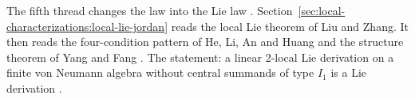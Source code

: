 The fifth thread changes the law into the Lie law
\cite[p.~209]{LiuZhang2017LocalLie}.
Section~\ref{sec:local-characterizations:local-lie-jordan} reads the local
Lie theorem of Liu and Zhang. It then reads the four-condition pattern of
He, Li, An and Huang and the structure theorem of Yang and Fang
\cite[p.~244]{YangFang2019}. The statement: a linear 2-local Lie
derivation on a finite von Neumann algebra without central summands of
type $I_1$ is a Lie derivation \cite[p.~250]{YangFang2019}.
